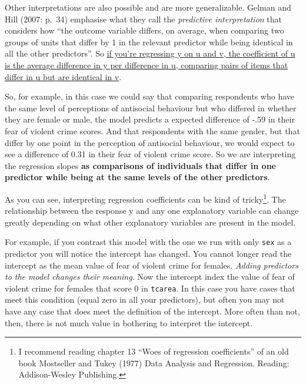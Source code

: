 \documentclass[]{book}
\let\rmarkdownfootnote\footnote%
\def\footnote{\protect\rmarkdownfootnote}
\theoremstyle{definition}
\theoremstyle{definition}
\theoremstyle{definition}
\theoremstyle{remark}
\begin{document}
Other interpretations are also possible and are more generalizable.
Gelman and Hill (2007: p.~34) emphasise what they call the
\emph{predictive interpretation} that considers how ``the outcome
variable differs, on average, when comparing two groups of units that
differ by 1 in the relevant predictor while being identical in all the
other predictors''. So
\href{http://andrewgelman.com/2013/01/05/understanding-regression-models-and-regression-coefficients/}{if
you're regressing y on u and v, the coefficient of u is the average
difference in y per difference in u, comparing pairs of items that
differ in u but are identical in v}.

So, for example, in this case we could say that comparing respondents
who have the same level of perceptions of antisocial behaviour but who
differed in whether they are female or male, the model predicts a
expected difference of -.59 in their fear of violent crime scores. And
that respondents with the same gender, but that differ by one point in
the perception of antisocial behaviour, we would expect to see a
difference of 0.31 in their fear of violent crime score. So we are
interpreting the regression slopes \textbf{as comparisons of individuals
that differ in one predictor while being at the same levels of the other
predictors}.

As you can see, interpreting regression coefficients can be kind of
tricky\footnote{I recommend reading chapter 13 ``Woes of regression
  coefficients'' of an old book Mostseller and Tukey (1977) Data
  Analysis and Regression. Reading: Addison-Wesley Publishing.}. The
relationship between the response y and any one explanatory variable can
change greatly depending on what other explanatory variables are present
in the model.

For example, if you contrast this model with the one we run with only
\texttt{sex} as a predictor you will notice the intercept has changed.
You cannot longer read the intercept as the mean value of fear of
violent crime for females. \emph{Adding predictors to the model changes
their meaning}. Now the intercept index the value of fear of violent
crime for females that score 0 in \texttt{tcarea}. In this case you have
cases that meet this condition (equal zero in all your predictors), but
often you may not have any case that does meet the definition of the
intercept. More often than not, then, there is not much value in
bothering to interpret the intercept.
\end{document}

